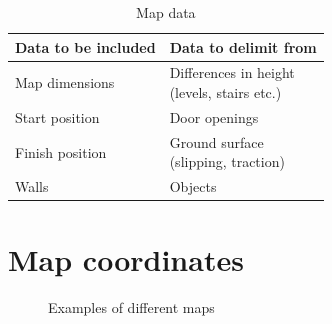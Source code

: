 \begin{table}[h!]
	\centering
	\caption{Map data}
	\begin{tabular}{|p{}||p{}|}
		\hline
		Data to be included & Data to delimit from \\ 
		\hline
		Map dimensions 		& \parbox[t]{0.4\textwidth}{Differences in height\\(levels, stairs etc.)}\\
		\hline
		Start position 		& Door openings \\
		\hline
		Finish position 	& \parbox[t]{0.4\textwidth}{Ground surface\\(slipping, traction)} \\
		\hline
		Walls 				& Objects\\
		\hline
	\end{tabular}
	\label{table:map_data}
\end{table}


\section{Map coordinates}
\label{sec:map_coordinates} %

\begin{figure}[h!tp]
    \centering
    \hspace{0.1\textwidth}
    \caption{Examples of different maps}
    \label{fig:floor_plans}
\end{figure}

